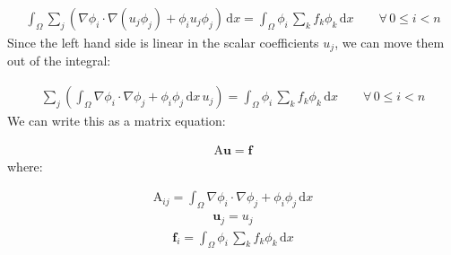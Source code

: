 \documentclass{book}
\begin{document}
\label{\detokenize{6_finite_element_problems:equation-6_finite_element_problems:0}}\begin{equation}\label{equation:6_finite_element_problems:6_finite_element_problems:0}
\begin{split}\int_\Omega \sum_{j}\left(\nabla \phi_i \cdot \nabla (u_j\phi_j) + \phi_i u_j\phi_j\right)\, \mathrm{d} x
= \int_\Omega \phi_i\, \sum_k f_k\phi_k\, \mathrm{d} x \qquad \forall\, 0\leq i < n\end{split}
\end{equation}
Since the left hand side is linear in the scalar coefficients \(u_j\), we can move them out of the integral:

\label{\detokenize{6_finite_element_problems:equation-6_finite_element_problems:1}}\begin{equation}\label{equation:6_finite_element_problems:6_finite_element_problems:1}
\begin{split}\sum_{j}\left(\int_\Omega \nabla \phi_i \cdot \nabla \phi_j + \phi_i\phi_j\, \mathrm{d} x\, u_j\right)
= \int_\Omega \phi_i\,\sum_k f_k\phi_k\, \mathrm{d} x \qquad \forall\, 0\leq i < n\end{split}
\end{equation}
We can write this as a matrix equation:

\label{\detokenize{6_finite_element_problems:equation-6_finite_element_problems:2}}\begin{equation}\label{equation:6_finite_element_problems:6_finite_element_problems:2}
\begin{split}\mathrm{A}\mathbf{u} = \mathbf{f}\end{split}
\end{equation}
where:

\label{\detokenize{6_finite_element_problems:equation-eq_lhs}}\begin{equation}\label{equation:6_finite_element_problems:eq_lhs}
\begin{split}\mathrm{A}_{ij} = \int_\Omega \nabla \phi_i \cdot \nabla \phi_j + \phi_i\phi_j\, \mathrm{d} x\end{split}
\end{equation}\label{\detokenize{6_finite_element_problems:equation-6_finite_element_problems:3}}\begin{equation}\label{equation:6_finite_element_problems:6_finite_element_problems:3}
\begin{split}\mathbf{u}_j = u_j\end{split}
\end{equation}\label{\detokenize{6_finite_element_problems:equation-eq_rhs}}\begin{equation}\label{equation:6_finite_element_problems:eq_rhs}
\begin{split}\mathbf{f}_i = \int_\Omega \phi_i\,\sum_k f_k\phi_k\, \mathrm{d} x\end{split}
\end{equation}
\end{document}
